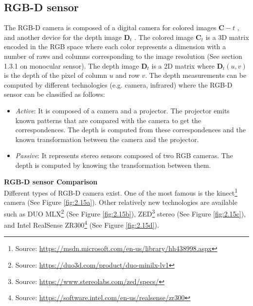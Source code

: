 \subsection{RGB-D sensor}
The RGB-D camera is composed of a digital camera for colored images $\mathbf{C}-t$ , and another device for the depth image $\mathbf{D}_t$ . The colored image $\mathbf{C}_t$ is a 3D matrix encoded in the RGB space where each color represents a dimension with a number of raws and columns corresponding to the image resolution (See section 1.3.1 on monocular sensor). The depth image $\mathbf{D}_t$ is a 2D matrix where $\mathbf{D}_t(u,v)$ is the depth of the pixel of column $u$ and row $v$. The depth measurements can be computed by diﬀerent technologies (e.g. camera, infrared) where the RGB-D sensor can be classiﬁed as follows:
\begin{itemize}
    \item \textit{Active}: It is composed of a camera and a projector. The projector emits known patterns that are compared with the camera to get the correspondences. The depth is computed from these correspondences and the known transformation between the camera and the projector.
    \item \textit{Passive}: It represents stereo sensors composed of two RGB cameras. The depth is computed by knowing the transformation between them.
\end{itemize}
\textbf{RGB-D sensor Comparison}\\
Diﬀerent types of RGB-D camera exist. One of the most famous is the kinect\footnote{Source: \url{https://msdn.microsoft.com/en-us/library/hh438998.aspx}} camera (See Figure \ref{fig:2.15a}). Other relatively new technologies are available such as DUO MLX\footnote{Source: \url{https://duo3d.com/product/duo-minilx-lv1}} (See Figure \ref{fig:2.15b}), ZED\footnote{Source: \url{https://www.stereolabs.com/zed/specs/}} stereo (See Figure \ref{fig:2.15c}), and Intel RealSense ZR300\footnote{Source: \url{https://software.intel.com/en-us/realsense/zr300}} (See Figure \ref{fig:2.15d}).
